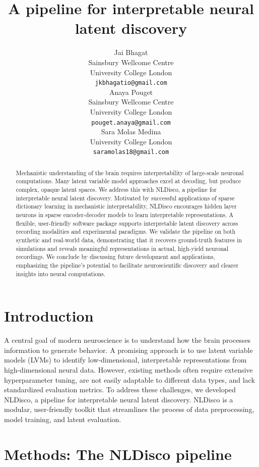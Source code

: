 \documentclass{article}
\title{A pipeline for interpretable neural latent discovery}
\author{
  Jai Bhagat \\
  Sainsbury Wellcome Centre \\
  University College London \\
  \texttt{jkbhagatio@gmail.com} \\
  \And
  Anaya Pouget \\
  Sainsbury Wellcome Centre \\
  University College London \\
  \texttt{pouget.anaya@gmail.com} \\
  \And
  Sara Molas Medina \\
  University College London \\
  \texttt{saramolas18@gmail.com} \\
}
\begin{document}
\maketitle

\begin{abstract}
Mechanistic understanding of the brain requires interpretability of large-scale neuronal computations. Many latent variable model approaches excel at decoding, but produce complex, opaque latent spaces. We address this with NLDisco, a pipeline for interpretable neural latent discovery. Motivated by successful applications of sparse dictionary learning in mechanistic interpretability, NLDisco encourages hidden layer neurons in sparse encoder-decoder models to learn interpretable representations. A flexible, user-friendly software package supports interpretable latent discovery across recording modalities and experimental paradigms. We validate the pipeline on both synthetic and real-world data, demonstrating that it recovers ground-truth features in simulations and reveals meaningful representations in actual, high-yield neuronal recordings. We conclude by discussing future development and applications, emphasizing the pipeline's potential to facilitate neuroscientific discovery and clearer insights into neural computations.
\end{abstract}

\section{Introduction}

A central goal of modern neuroscience is to understand how the brain processes information to generate behavior. A promising approach is to use latent variable models (LVMs) to identify low-dimensional, interpretable representations from high-dimensional neural data. However, existing methods often require extensive hyperparameter tuning, are not easily adaptable to different data types, and lack standardized evaluation metrics. To address these challenges, we developed NLDisco, a pipeline for interpretable neural latent discovery. NLDisco is a modular, user-friendly toolkit that streamlines the process of data preprocessing, model training, and latent evaluation.

\section{Methods: The NLDisco pipeline}
\end{document}
